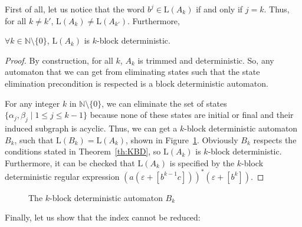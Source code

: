 \documentclass{llncs}
\begin{document}
	First of all, let us notice that the word $b^j\in \mathrm{L}(A_k)$ if and only if $j=k$.
	Thus, for all $k \neq k'$, $\mathrm{L}(A_k) \neq \mathrm{L}(A_{k'})$. Furthermore,

\begin{proposition}
	$\forall k \in \mathbb{N} \setminus \{0\}$, $\mathrm{L}(A_k)$ is $k$-block deterministic.
\end{proposition}
\begin{proof}
	By construction, for all $k$, $A_k$ is trimmed and deterministic.
	So, any automaton that we can get from eliminating states such that the state elimination precondition is respected is a block deterministic automaton. 

	For any integer $k$ in $\mathbb{N} \setminus \{0\}$, we can eliminate the set of states $\{\alpha_j, \beta_j \mid 1 \leq j \leq k - 1\}$ because none of these states are initial or final and their induced subgraph is acyclic.	
	Thus, we can get a $k$-block deterministic automaton $B_k$, such that $\mathrm{L}(B_k) = \mathrm{L}(A_k)$, shown in Figure~\ref{fg:bk}. 	
	Obviously $B_k$ respects the conditions stated in Theorem~\ref{th:KBD}, so $\mathrm{L}(A_k)$ is $k$-block deterministic. Furthermore, it can be checked that $\mathrm{L}(A_k)$ is specified by the $k$-block deterministic regular expression $(a(\varepsilon + [b^{k-1}c]))^*(\varepsilon + [b^k])$.
\end{proof}


\begin{figure}[H]
	\centering
	
	
	\caption{The $k$-block deterministic automaton $B_k$}
	\label{fg:bk}
\end{figure}		

Finally, let us show that the index cannot be reduced:
\end{document}
